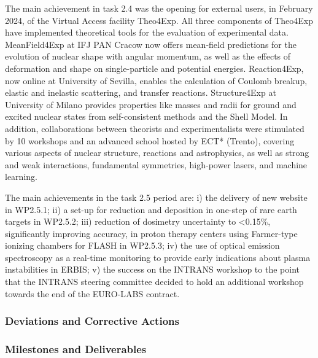 The main achievement in task 2.4 was the opening for external users, in February 2024, of the Virtual Access facility Theo4Exp. All three components of Theo4Exp have implemented theoretical tools for the evaluation of experimental data. MeanField4Exp at IFJ PAN Cracow now offers mean-field predictions for the evolution of nuclear shape with angular momentum, as well as the effects of deformation and shape on single-particle and potential energies. Reaction4Exp, now online at University of Sevilla, enables the calculation of Coulomb breakup, elastic and inelastic scattering, and transfer reactions. Structure4Exp at University of Milano provides properties like masses and radii for ground and excited nuclear states from self-consistent methods and the Shell Model. In addition, collaborations between theorists and experimentalists were stimulated by 10 workshops and an advanced school hosted by ECT* (Trento), covering various aspects of nuclear structure, reactions and astrophysics, as well as strong and weak interactions, fundamental symmetries, high-power lasers, and machine learning.

The main achievements in the task 2.5 period are: i) the delivery of new website in WP2.5.1; ii) a set-up for reduction and deposition in one-step of rare earth targets in WP2.5.2; iii) reduction of dosimetry uncertainty to <0.15\%, significantly improving accuracy, in proton therapy centers using Farmer-type ionizing chambers for FLASH in WP2.5.3; iv) the use of optical emission spectroscopy as a real-time monitoring to provide early indications about plasma instabilities in ERBIS; v) the success on the INTRANS workshop to the point that the INTRANS steering committee decided to hold an additional workshop towards the end of the EURO-LABS contract.





\subsubsection*{Deviations and Corrective Actions}


\subsubsection*{Milestones and Deliverables}

